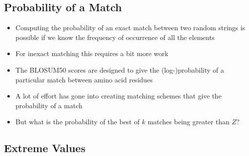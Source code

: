 
\begin{slide}
\section{Probability of a Match}

\begin{PauseHighLight}
  \begin{itemize}
  \item Computing the probability of an exact match between two random
    strings is possible if we know the frequency of occurrence of all
    the elements\pause
  \item For inexact matching this requires a bit more work\pause
  \item The BLOSUM50 scores are designed to give the (log-)probability of a
    particular match between amino acid residues\pause
  \item A lot of effort has gone into creating matching schemes that
    give the probability of a match\pause
  \item But what is the probability of the best of $k$ matches being
    greater than $Z$?\pause
  \end{itemize}
\end{PauseHighLight}

\end{slide}


\begin{slide}
\section[-2]{Extreme Values}
\pause
{}
\pb
\begin{center}
  \pause
\end{center}
\end{slide}


